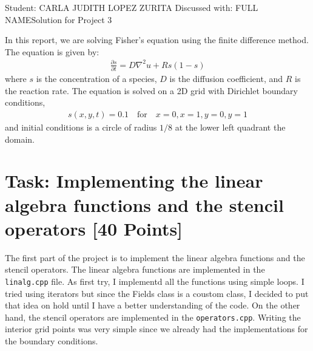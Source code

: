 \documentclass[unicode,11pt,a4paper,oneside,numbers=endperiod,openany]{scrartcl}
\begin{document}
\setassignment
{}

            {Student: CARLA JUDITH LOPEZ ZURITA}
            {Discussed with: FULL NAME}{Solution for Project 3}{}
\newline

\assignmentpolicy

In this report, we are solving Fisher's equation using the finite difference
method. The equation is given by:
\begin{align}
    \frac{\partial s}{\partial t} = D \nabla^2 u + R s (1 - s)
\end{align}
where $s$ is the concentration of a species, $D$ is the diffusion coefficient,
and $R$ is the reaction rate. The equation is solved on a 2D grid with
Dirichlet boundary conditions,
\begin{align}
    s(x, y, t) = 0.1 \quad \text{for} \quad x = 0, x = 1, y = 0, y = 1
\end{align}
and initial conditions is a circle of radius $1/8$ at the lower left quadrant the domain.
\section{Task: Implementing the linear algebra functions and the stencil
         operators [40 Points]}

The first part of the project is to implement the linear algebra functions and
the stencil operators. The linear algebra functions are implemented in the
\texttt{linalg.cpp} file. As first try, I implementd all the functions using
simple loops. I tried using iterators but since the Fields class is a coustom
class, I decided to put that idea on hold until I have a better understanding of
the code. On the other hand, the stencil operators are implemented in the
\texttt{operators.cpp}. Writing the interior grid points was very simple since
we already had the implementations for the boundary conditions.
\end{document}
